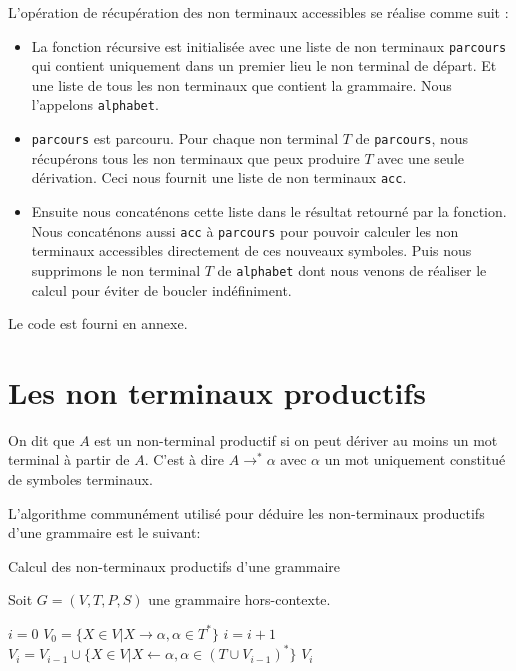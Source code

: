 \documentclass[11pt,a4paper]{article}
\def\code#1{\texttt{#1}} %
\begin{document}
L'opération de récupération des non terminaux accessibles se réalise
comme suit :

\begin{itemize}
    \item La fonction récursive est initialisée avec une liste
    de non terminaux \code{parcours} qui contient uniquement
    dans un premier lieu le non terminal de départ.
    Et une liste de tous les non terminaux que contient
    la grammaire. Nous l'appelons \code{alphabet}.
    \item \code{parcours} est parcouru. Pour chaque non terminal $T$
    de \code{parcours}, nous récupérons tous les non terminaux
    que peux produire $T$ avec une seule dérivation. Ceci nous fournit
    une liste de non terminaux \code{acc}.
    \item Ensuite nous concaténons cette liste dans le résultat
    retourné par la fonction. Nous concaténons aussi \code{acc}
    à \code{parcours} pour pouvoir calculer les non terminaux
    accessibles directement de ces nouveaux symboles.
    Puis nous supprimons le non terminal $T$ de \code{alphabet}
    dont nous venons de réaliser le calcul pour éviter de boucler indéfiniment.
\end{itemize}

Le code est fourni en annexe.

\newpage


\section{Les non terminaux productifs}

On dit que $A$ est un non-terminal productif si on peut dériver au moins un mot terminal à partir de $A$. C'est à dire $A \rightarrow^* \alpha$ avec $\alpha$ un mot uniquement constitué de symboles terminaux.
\newline

L'algorithme communément utilisé pour déduire les non-terminaux productifs d'une grammaire est le suivant:
\begin{algorithm}
\caption{Calcul des non-terminaux productifs d'une grammaire}
Soit $G=(V,T,P,S)$ une grammaire hors-contexte.
\begin{algorithmic}
\STATE $i = 0$
\STATE $V_0 = \{X \in V | X \rightarrow \alpha, \alpha \in T^*\}$
\REPEAT
\STATE $i=i+1$
\STATE $V_i = V_{i-1} \cup \{X \in V | X \leftarrow \alpha, \alpha \in (T \cup V_{i-1})^*\}$
\RETURN $V_i$
\end{algorithmic}
\end{algorithm}
\newline
\end{document}
